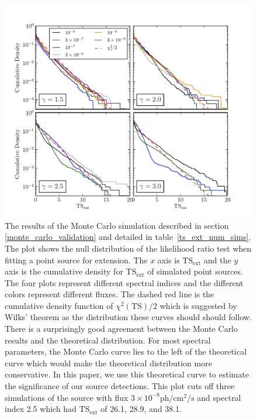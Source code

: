 \documentclass[12pt,preprint]{aastex}
\newcommand{\ph}{\text{ph}\xspace}
\newcommand{\cm}{\text{cm}\xspace}
\renewcommand{\sec}{\text{s}\xspace}
\newcommand{\tsext}{{\ensuremath{\text{TS}_\text{ext}}}\xspace}
\newcommand{\ts}{\text{TS}\xspace}
\begin{document}
\clearpage
\begin{figure}
  \begin{center}
    \includegraphics{mc_plots/ts_ext_emin_1000.pdf}
    \end{center}
    \caption{
    The results of the Monte Carlo simulation described
    in section \ref{monte_carlo_validation} and detailed in
    table~\ref{ts_ext_num_sims}. The plot shows the null distribution of
    the likelihood ratio test when fitting a point source for extension.
    The $x$ axis is \tsext and the $y$ axis is the cumulative density
    for \tsext of simulated point sources. The four plots represent
    different spectral indices and the different colors represent
    different fluxes.  The dashed red line is the cumulative density
    function of $\chi^2(\ts)/2$ which is suggested by Wilks' theorem
    as the distribution these curves should should follow.  There is
    a surprisingly good agreement between the Monte Carlo results and
    the theoretical distribution. For most spectral parameters, the
    Monte Carlo curve lies to the left of the theoretical curve which
    would make the theoretical distribution more conservative.  In this
    paper, we use this theoretical curve to estimate the significance of
    our source detections. This plot cuts off three simulations of the
    source with flux $3\times10^{-8}\ph/\cm^2/\sec$ and spectral index
    2.5 which had \tsext of 26.1, 28.9, and 38.1.
    }\label{ts_ext_mc}
  \end{figure}
\end{document}
